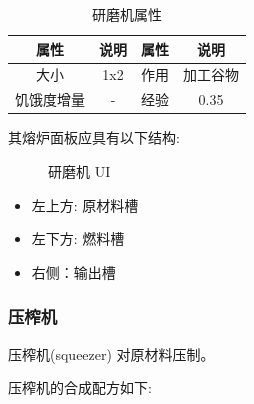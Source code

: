 \begin{table}[H]
    \centering
    \caption{研磨机属性}
    \setlength{\tabcolsep}{4mm}
    \begin{tabular}{c|cc|c}
        \toprule
        \textbf{属性} & \textbf{说明} & \textbf{属性} & \textbf{说明} \\
        \midrule
        大小 & 1x2 & 作用 & 加工谷物 \\
        饥饿度增量 & - & 经验 & 0.35 \\
        \bottomrule
    \end{tabular}
\end{table}

其熔炉面板应具有以下结构:

\begin{figure}[H]
    \centering
    \caption{研磨机 UI}
\end{figure}

\begin{itemize}
    \item 左上方: 原材料槽
    \item 左下方: 燃料槽
    \item 右侧：输出槽
\end{itemize}

\subsubsection{压榨机}

压榨机(squeezer) 对原材料压制。

压榨机的合成配方如下:

